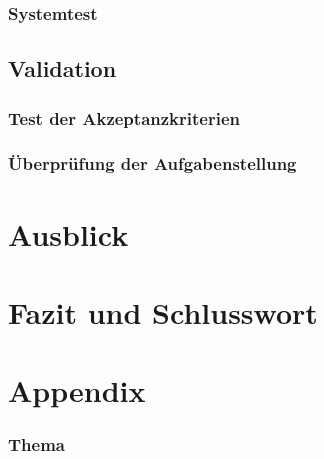 \documentclass[oneside,11pt,parskip=half,ngerman]{scrreprt}
\begin{document}
\subsection{Systemtest}\label{systemtest}

\section{Validation}\label{validation}

\subsection{Test der
Akzeptanzkriterien}\label{test-der-akzeptanzkriterien-1}

\subsection{Überprüfung der
Aufgabenstellung}\label{uxfcberpruxfcfung-der-aufgabenstellung-1}

\chapter{Ausblick}\label{ausblick}

\chapter{Fazit und Schlusswort}\label{fazit-und-schlusswort}

\appendix

\chapter{Appendix}\label{appendixA}



\subsection{Thema}\label{thema}
\end{document}
